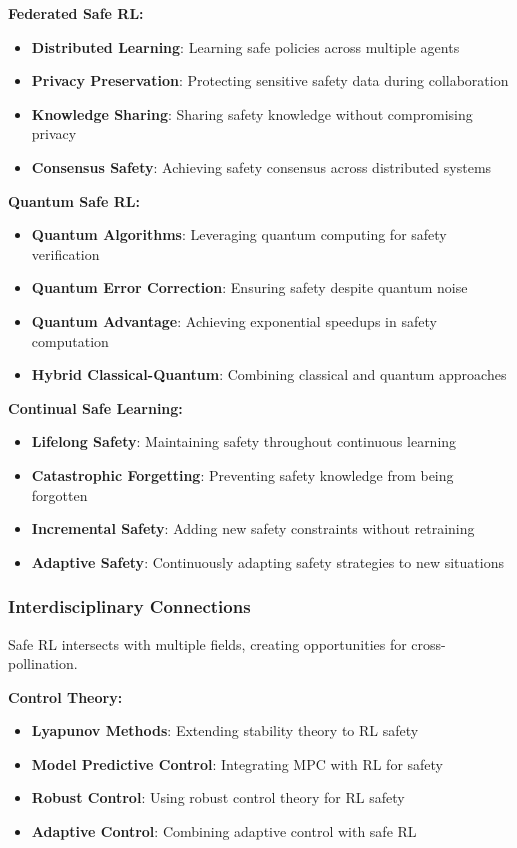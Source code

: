 \documentclass[12pt]{article}
\begin{document}
{{{{\textbf{Federated Safe RL:}
\begin{itemize}
\item \textbf{Distributed Learning}: Learning safe policies across multiple agents
\item \textbf{Privacy Preservation}: Protecting sensitive safety data during collaboration
\item \textbf{Knowledge Sharing}: Sharing safety knowledge without compromising privacy
\item \textbf{Consensus Safety}: Achieving safety consensus across distributed systems
\end{itemize}

\textbf{Quantum Safe RL:}
\begin{itemize}
\item \textbf{Quantum Algorithms}: Leveraging quantum computing for safety verification
\item \textbf{Quantum Error Correction}: Ensuring safety despite quantum noise
\item \textbf{Quantum Advantage}: Achieving exponential speedups in safety computation
\item \textbf{Hybrid Classical-Quantum}: Combining classical and quantum approaches
\end{itemize}

\textbf{Continual Safe Learning:}
\begin{itemize}
\item \textbf{Lifelong Safety}: Maintaining safety throughout continuous learning
\item \textbf{Catastrophic Forgetting}: Preventing safety knowledge from being forgotten
\item \textbf{Incremental Safety}: Adding new safety constraints without retraining
\item \textbf{Adaptive Safety}: Continuously adapting safety strategies to new situations
\end{itemize}

\subsubsection{Interdisciplinary Connections}

Safe RL intersects with multiple fields, creating opportunities for cross-pollination.

\textbf{Control Theory:}
\begin{itemize}
\item \textbf{Lyapunov Methods}: Extending stability theory to RL safety
\item \textbf{Model Predictive Control}: Integrating MPC with RL for safety
\item \textbf{Robust Control}: Using robust control theory for RL safety
\item \textbf{Adaptive Control}: Combining adaptive control with safe RL
\end{itemize}

}}}}
\end{document}
